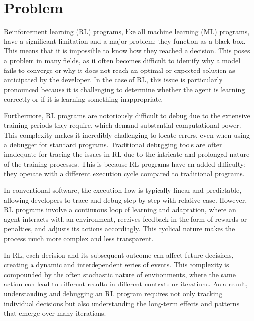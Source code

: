 
\chapter{Problem}
\label{cha:problem}

Reinforcement learning (RL) programs, like all machine learning (ML) programs, 
have a significant limitation and a major problem: they function as a black box. 
This means that it is impossible to know how they reached a decision. This poses 
a problem in many fields, as it often becomes difficult to identify why a model 
fails to converge or why it does not reach an optimal or expected solution as 
anticipated by the developer. In the case of RL, this issue is particularly 
pronounced because it is challenging to determine whether the agent is learning 
correctly or if it is learning something inappropriate.

Furthermore, RL programs are notoriously difficult to debug due to the extensive 
training periods they require, which demand substantial computational power. This 
complexity makes it incredibly challenging to locate errors, even when using a 
debugger for standard programs. Traditional debugging tools are often inadequate 
for tracing the issues in RL due to the intricate and prolonged nature of the 
training processes. This is because RL programs have an added difficulty: they 
operate with a different execution cycle compared to traditional programs.

In conventional software, the execution flow is typically linear and predictable, 
allowing developers to trace and debug step-by-step with relative ease. However, 
RL programs involve a continuous loop of learning and adaptation, where an agent 
interacts with an environment, receives feedback in the form of rewards or 
penalties, and adjusts its actions accordingly. This cyclical nature makes the 
process much more complex and less transparent.

In RL, each decision and its subsequent outcome can affect future decisions, 
creating a dynamic and interdependent series of events. This complexity is 
compounded by the often stochastic nature of environments, where the same action 
can lead to different results in different contexts or iterations. As a result, 
understanding and debugging an RL program requires not only tracking individual 
decisions but also understanding the long-term effects and patterns that emerge 
over many iterations.

